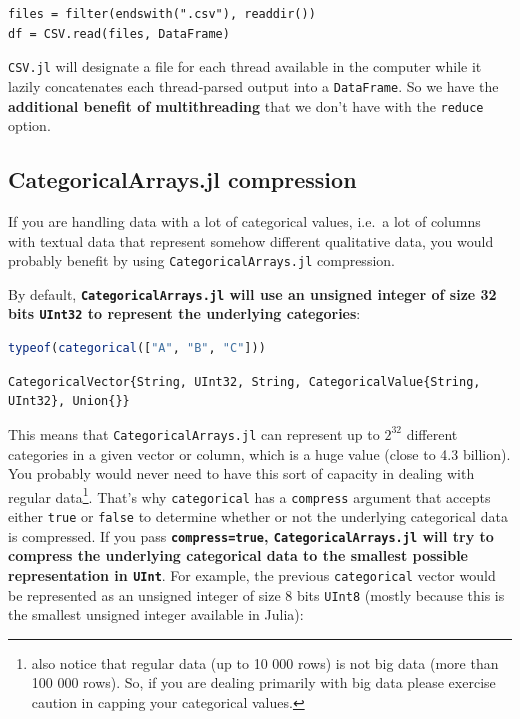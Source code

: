 \documentclass[
  notoc %
]{tufte-book}
\newcommand{\passthrough}[1]{#1}
\begin{document}
\begin{lstlisting}
files = filter(endswith(".csv"), readdir())
df = CSV.read(files, DataFrame)
\end{lstlisting}

\passthrough{\lstinline!CSV.jl!} will designate a file for each thread
available in the computer while it lazily concatenates each
thread-parsed output into a \passthrough{\lstinline!DataFrame!}. So we
have the \textbf{additional benefit of multithreading} that we don't
have with the \passthrough{\lstinline!reduce!} option.

\hypertarget{sec:df_performance_categorical_compression}{%
\subsection{CategoricalArrays.jl
compression}\label{sec:df_performance_categorical_compression}}

If you are handling data with a lot of categorical values, i.e.~a lot of
columns with textual data that represent somehow different qualitative
data, you would probably benefit by using
\passthrough{\lstinline!CategoricalArrays.jl!} compression.

By default, \textbf{\passthrough{\lstinline!CategoricalArrays.jl!} will
use an unsigned integer of size 32 bits \passthrough{\lstinline!UInt32!}
to represent the underlying categories}:

\begin{lstlisting}[language=Julia]
typeof(categorical(["A", "B", "C"]))
\end{lstlisting}

\begin{lstlisting}
CategoricalVector{String, UInt32, String, CategoricalValue{String, UInt32}, Union{}}
\end{lstlisting}

This means that \passthrough{\lstinline!CategoricalArrays.jl!} can
represent up to \(2^{32}\) different categories in a given vector or
column, which is a huge value (close to 4.3 billion). You probably would
never need to have this sort of capacity in dealing with regular
data\footnote{also notice that regular data (up to 10 000 rows) is not
  big data (more than 100 000 rows). So, if you are dealing primarily
  with big data please exercise caution in capping your categorical
  values.}. That's why \passthrough{\lstinline!categorical!} has a
\passthrough{\lstinline!compress!} argument that accepts either
\passthrough{\lstinline!true!} or \passthrough{\lstinline!false!} to
determine whether or not the underlying categorical data is compressed.
If you pass \textbf{\passthrough{\lstinline!compress=true!},
\passthrough{\lstinline!CategoricalArrays.jl!} will try to compress the
underlying categorical data to the smallest possible representation in
\passthrough{\lstinline!UInt!}}. For example, the previous
\passthrough{\lstinline!categorical!} vector would be represented as an
unsigned integer of size 8 bits \passthrough{\lstinline!UInt8!} (mostly
because this is the smallest unsigned integer available in Julia):
\end{document}
